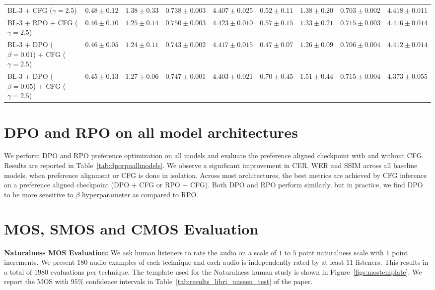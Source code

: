 \begin{table*}[t]
{\begin{tabular}{l|cccc|cccc}
BL-3 + CFG ($\gamma=2.5$) & $0.48 \pm 0.12$ & $1.38 \pm 0.33$ & $0.738 \pm 0.003$ & $4.407 \pm 0.025$ & $0.52 \pm 0.11$ & $1.38 \pm 0.20$ & $0.703 \pm 0.002$ & $\mathbf{4.418 \pm 0.011}$ \\ 
BL-3 + RPO + CFG ($\gamma=2.5$)& $0.46 \pm 0.10$ & $1.25 \pm 0.14$ & $\mathbf{0.750 \pm 0.003}$ & $\mathbf{4.423 \pm 0.010}$ & $0.57 \pm 0.15$ & $1.33 \pm 0.21$ & $\mathbf{0.715 \pm 0.003}$ & $4.416 \pm 0.014$ \\ 
BL-3 + DPO ($\beta=0.01$) + CFG ($\gamma=2.5$)& $0.46 \pm 0.05$ & $\mathbf{1.24 \pm 0.11}$ & $0.743 \pm 0.002$ & $4.417 \pm 0.015$ & $\mathbf{0.47 \pm 0.07}$ & $\mathbf{1.26 \pm 0.09}$ & $0.706 \pm 0.004$ & $4.412 \pm 0.014$ \\ 
BL-3 + DPO ($\beta=0.05$) + CFG ($\gamma=2.5$)& $\mathbf{0.45 \pm 0.13}$ & $1.27 \pm 0.06$ & $0.747 \pm 0.001$ & $4.403 \pm 0.021$ & $0.70 \pm 0.45$ & $1.51 \pm 0.44$ & $\mathbf{0.715 \pm 0.004}$ & $4.373 \pm 0.055$ \\ 
\bottomrule
\end{tabular} 
}
\label{tab:dporpoallmodels}
\end{table*}
\vspace{-5mm}




\section{DPO and RPO on all model architectures}
\label{sec:dporpoall}
We perform DPO and RPO preference optimization on all models and evaluate the preference aligned checkpoint with and without CFG. Results are reported in Table~\ref{tab:dporpoallmodels}. We observe a significant improvement in CER, WER and SSIM across all baseline models, when preference alignment or CFG is done in isolation. Across most architectures, the best metrics are achieved by CFG inference on a preference aligned checkpoint (DPO + CFG or RPO + CFG). 
Both DPO and RPO perform similarly, but in practice, we find DPO to be more sensitive to $\beta$ hyperparameter as compared to RPO.



\section{MOS, SMOS and CMOS Evaluation}
\label{sec:humaneval}
\textbf{Naturalness MOS Evaluation:} We ask human listeners to rate the audio on a scale of $1$ to $5$ point naturalness scale with $1$ point increments. We present $180$ audio examples of each technique and each audio is independently rated by at least $11$ listeners. This results in a total of $1980$ evaluations per technique. 
The template used for the Naturalness human study is shown in Figure~\ref{figs:mostemplate}. We report the MOS with $95\%$ confidence intervals in Table~\ref{tab:results_libri_unseen_test} of the paper.

